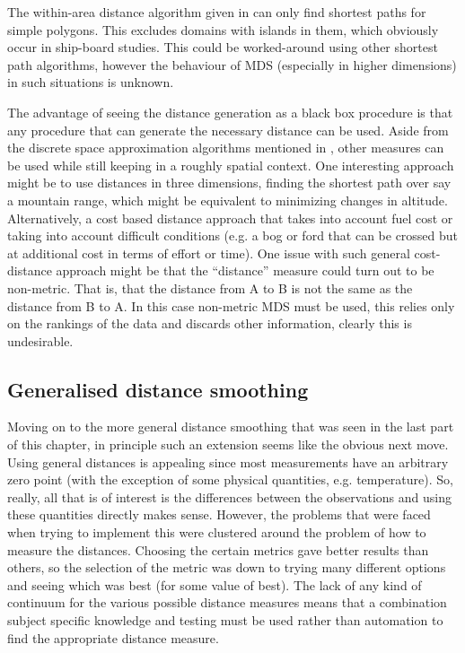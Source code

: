 The within-area distance algorithm given in  can only find shortest paths for simple polygons. This excludes domains with islands in them, which obviously occur in ship-board studies. This could be worked-around using other shortest path algorithms, however the behaviour of MDS (especially in higher dimensions) in such situations is unknown.

The advantage of seeing the distance generation as a black box procedure is that any procedure that can generate the necessary distance can be used. Aside from the discrete space approximation algorithms mentioned in , other measures can be used while still keeping in a roughly spatial context. One interesting approach might be to use distances in three dimensions, finding the shortest path over say a mountain range, which might be equivalent to minimizing changes in altitude. Alternatively, a cost based distance approach that takes into account fuel cost or taking into account difficult conditions (e.g. a bog or ford that can be crossed but at additional cost in terms of effort or time).  One issue with such general cost-distance approach might be that the ``distance'' measure could turn out to be non-metric. That is, that the distance from A to B is not the same as the distance from B to A. In this case non-metric MDS must be used, this relies only on the rankings of the data and discards other information, clearly this is undesirable.

\subsection{Generalised distance smoothing}

Moving on to the more general distance smoothing that was seen in the last part of this chapter, in principle such an extension seems like the obvious next move. Using general distances is appealing since most measurements have an arbitrary zero point (with the exception of some physical quantities, e.g. temperature). So, really, all that is of interest is the differences between the observations and using these quantities directly makes sense. However, the problems that were faced when trying to implement this were clustered around the problem of how to measure the distances. Choosing the certain metrics gave better results than others, so the selection of the metric was down to trying many different options and seeing which was best (for some value of best). The lack of any kind of continuum for the various possible distance measures means that a combination subject specific knowledge and testing  must be used rather than automation to find the appropriate distance measure.

